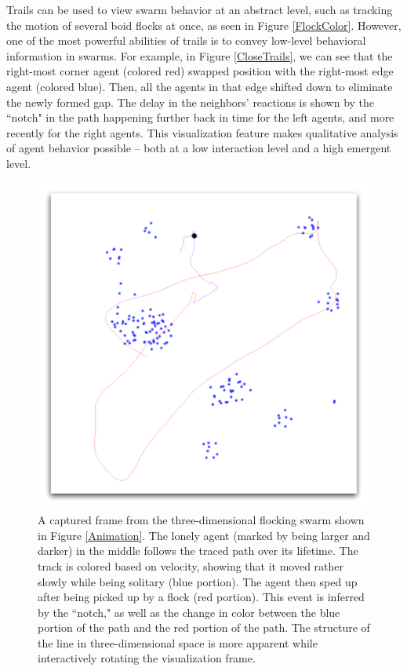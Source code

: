 \documentclass[conference]{IEEEtran}
\begin{document}
Trails can be used to view swarm behavior at an abstract level, such as tracking the motion of several boid
flocks at once, as seen in Figure \ref{FlockColor}.
However, one of the most powerful abilities of trails is to convey low-level behavioral information in swarms.
For example, in Figure \ref{CloseTrails}, we can see that the right-most corner agent (colored red)
swapped position with the right-most edge agent (colored blue).
Then, all the agents in that edge shifted down to eliminate the newly formed gap.
The delay in the neighbors' reactions is shown by the ``notch" in the path happening
further back in time for the left agents, and more recently for the right agents.
This visualization feature makes qualitative analysis of agent behavior possible -- both at a low interaction level
and a high emergent level.







\begin{figure}
\centering
\includegraphics[scale=.4]{images/track.pdf}
\caption{
A captured frame from the three-dimensional flocking swarm shown in Figure \ref{Animation}.
The lonely agent (marked by being larger and darker) in the middle follows the traced path over its lifetime.
The track is colored based on velocity, showing that it moved rather slowly while being solitary (blue portion).
The agent then sped up after being picked up by a flock (red portion).
This event is inferred by the ``notch," as well as the change in color between the blue portion of the  path and the red portion of the path.
The structure of the line in three-dimensional space is more apparent while interactively rotating the visualization frame.}
\label{Track}
\end{figure}
\end{document}
